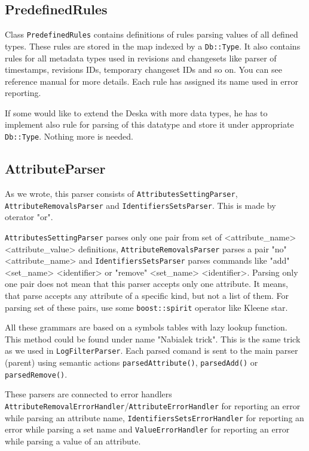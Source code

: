 \documentclass[deska]{subfiles}
\begin{document}
\subsection{PredefinedRules}

Class {\tt PredefinedRules} contains definitions of rules parsing values of all defined types. These rules are stored
in the map indexed by a {\tt Db::Type}. It also contains rules for all metadata types used in revisions and changesets
like parser of timestamps, revisions IDs, temporary changeset IDs and so on. You can see reference manual for more details.
Each rule has assigned its name used in error reporting.

If some would like to extend the Deska with more data types, he has to implement also rule for parsing of this datatype
and store it under appropriate {\tt Db::Type}. Nothing more is needed.

\subsection{AttributeParser}

As we wrote, this parser consists of {\tt AttributesSettingParser}, {\tt AttributeRemovalsParser} and {\tt IdentifiersSetsParser}.
This is made by oterator "or".

{\tt AttributesSettingParser} parses only one pair from set of <attribute\_name> <attribute\_value> definitions, {\tt AttributeRemovalsParser}
parses a pair "no" <attribute\_name> and {\tt IdentifiersSetsParser} parses commands like "add" <set\_name> <identifier> or
"remove" <set\_name> <identifier>. Parsing only one pair does not mean that this parser accepts only
one attribute. It means, that parse accepts any attribute of a specific kind, but not a list of them.
For parsing set of these pairs, use some {\tt boost::spirit} operator like Kleene star.

All these grammars are based on a symbols tables with lazy lookup function. This method could be found
under name "Nabialek trick". This is the same trick as we used in {\tt LogFilterParser}. Each parsed comand is sent to the
main parser (parent) using semantic actions {\tt parsedAttribute()}, {\tt parsedAdd()} or {\tt parsedRemove()}.

These parsers are connected to error handlers {\tt AttributeRemovalErrorHandler}/{\tt AttributeErrorHandler} for reporting an error
while parsing an attribute name, {\tt IdentifiersSetsErrorHandler} for reporting an error while parsing a set name and
{\tt ValueErrorHandler} for reporting an error while parsing a value of an attribute.
\end{document}
